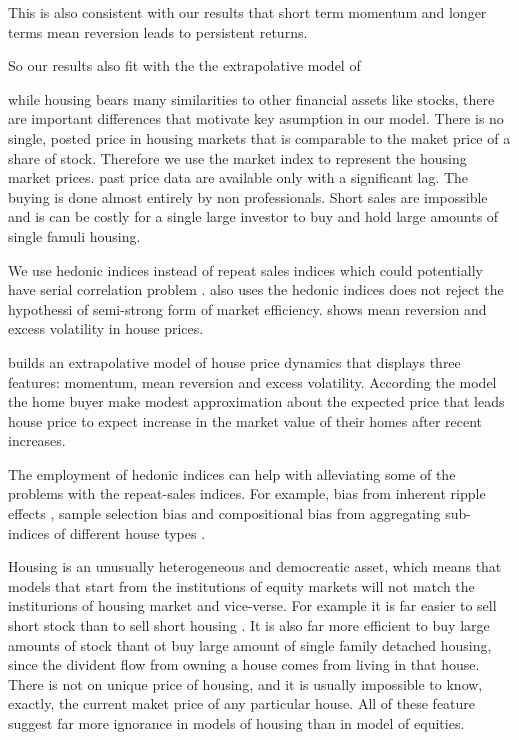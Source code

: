 \documentclass[AEJ,reqno, draftmode]{AEA}
\begin{document}
This is also consistent with our results that short term momentum and longer terms mean reversion leads to persistent returns.

So our results also fit with the  the extrapolative model of \citet{glaeser2017extrapolative}

while housing bears many similarities to other financial assets like stocks, there are important differences that motivate key asumption in our model. There is no single, posted price in housing markets that is comparable to the maket price of a share of stock. Therefore we use the market index to represent the housing market prices.
 past price data are available only with a significant lag. The buying is done almost entirely by non professionals. Short sales are impossible and is can be costly for a single large investor to buy and hold large amounts of single famuli housing. 
 
We use hedonic indices instead of repeat sales indices which could potentially have serial correlation problem \citep{Case1989125,kuo1996serial}. \citet{Linneman1986AnMarket} also uses the hedonic indices does not reject the hypothessi of semi-strong form of market efficiency. 
\citep{glaeser2014housing} shows mean reversion and excess volatility in house prices.

\citet{glaeser2017extrapolative} builds an extrapolative model of house price dynamics that displays three features: momentum, mean reversion and excess volatility. According the model the home buyer make modest approximation about the expected price that leads house price to expect increase in the market value of their homes after recent increases.


The employment of hedonic indices can help with alleviating some of the problems with the repeat-sales indices. For example, bias from inherent ripple effects \citet{sommervoll2006temporal}, sample selection bias and compositional bias from aggregating sub-indices of different house types \citet{dombrow1997aggregation}.

\citet{glaeser2017extrapolative} Housing is an unusually heterogeneous and democreatic asset, which means that models that start from the institutions of equity markets will not match the institurions of housing market and vice-verse. For example it is far easier to sell short stock than to sell short housing . It is also far more efficient to buy large amounts of stock thant ot buy large amount of single family detached housing, since the divident flow from owning a house comes from living in that house. There is not on unique price of housing, and it is usually impossible to know, exactly, the current maket price of any particular house. All of these feature suggest far more ignorance in models of housing than in model of equities.
\end{document}
